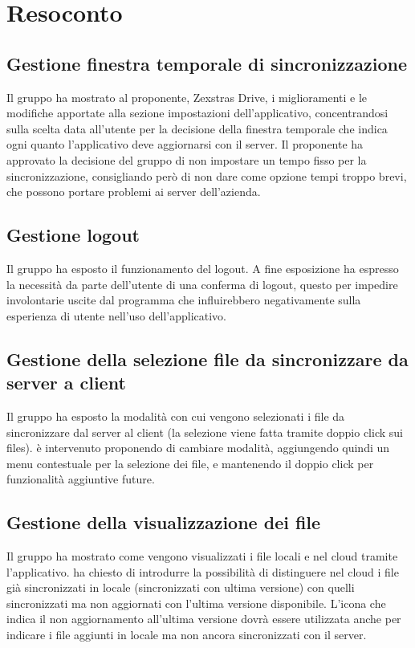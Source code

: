 \section{Resoconto}
\subsection{Gestione finestra temporale di sincronizzazione}
Il gruppo ha mostrato al proponente, Zexstras Drive, i miglioramenti e le modifiche apportate alla sezione impostazioni dell'applicativo, concentrandosi sulla scelta data all'utente per la decisione della finestra temporale che indica ogni quanto l'applicativo deve aggiornarsi con il server. Il proponente ha approvato la decisione del gruppo di non impostare un tempo fisso per la sincronizzazione, consigliando però di non dare come opzione tempi troppo brevi, che possono portare problemi ai server dell'azienda.

\subsection{Gestione logout}
Il gruppo ha esposto il funzionamento del logout. A fine esposizione \textit{\Alessio{}} ha espresso la necessità da parte dell'utente di una conferma di logout, questo per impedire involontarie uscite dal programma che influirebbero negativamente sulla esperienza di utente nell'uso dell'applicativo.

\subsection{Gestione della selezione file da sincronizzare da server a client}
Il gruppo ha esposto la modalità con cui vengono selezionati i file da sincronizzare dal server al client (la selezione viene fatta tramite doppio click sui files). \textit{\Alessio{}} è intervenuto proponendo di cambiare modalità, aggiungendo quindi un menu contestuale per la selezione dei file, e mantenendo il doppio click per funzionalità aggiuntive future. 

\subsection{Gestione della visualizzazione dei file}
Il gruppo ha mostrato come vengono visualizzati i file locali e nel cloud tramite l'applicativo. \textit{\Alessio{}} ha chiesto di introdurre la possibilità di distinguere nel cloud i file già sincronizzati in locale (sincronizzati con ultima versione) con quelli sincronizzati ma non aggiornati con l'ultima versione disponibile. L'icona che indica il non aggiornamento all'ultima versione dovrà essere utilizzata anche per indicare i file aggiunti in locale ma non ancora sincronizzati con il server. 

